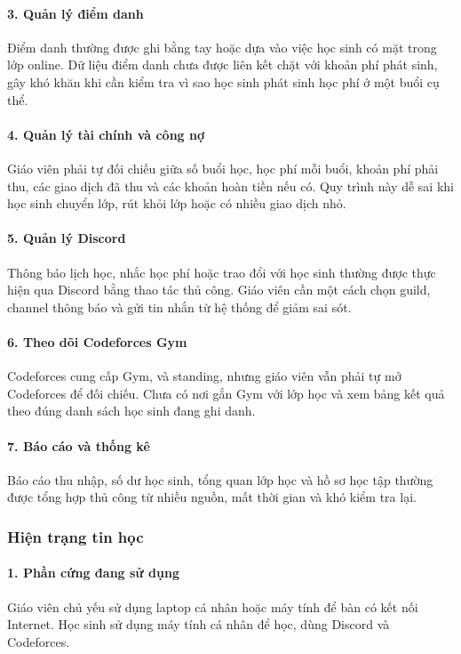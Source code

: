\documentclass[12pt,a4paper]{article}
\newcommand{\code}[1]{{\ttfamily\seqsplit{#1}}}
\begin{document}
\paragraph{3. Quản lý điểm danh}
Điểm danh thường được ghi bằng tay hoặc dựa vào việc học sinh có mặt trong lớp
online. Dữ liệu điểm danh chưa được liên kết chặt với khoản phí phát sinh, gây
khó khăn khi cần kiểm tra vì sao học sinh phát sinh học phí ở một buổi cụ thể.

\paragraph{4. Quản lý tài chính và công nợ}
Giáo viên phải tự đối chiếu giữa số buổi học, học phí mỗi buổi, khoản phí phải
thu, các giao dịch đã thu và các khoản hoàn tiền nếu có. Quy trình này dễ sai
khi học sinh chuyển lớp, rút khỏi lớp hoặc có nhiều giao dịch nhỏ.

\paragraph{5. Quản lý Discord}
Thông báo lịch học, nhắc học phí hoặc trao đổi với học sinh thường được thực
hiện qua Discord bằng thao tác thủ công. Giáo viên cần một cách chọn guild,
channel thông báo và gửi tin nhắn từ hệ thống để giảm sai sót.

\paragraph{6. Theo dõi Codeforces Gym}
Codeforces cung cấp Gym, \code{GymProblem} và standing, nhưng giáo viên vẫn phải tự mở
Codeforces để đối chiếu. Chưa có nơi gắn Gym với lớp học và xem bảng kết quả
theo đúng danh sách học sinh đang ghi danh.

\paragraph{7. Báo cáo và thống kê}
Báo cáo thu nhập, số dư học sinh, tổng quan lớp học và hồ sơ học tập thường
được tổng hợp thủ công từ nhiều nguồn, mất thời gian và khó kiểm tra lại.

\subsubsection{Hiện trạng tin học}

\paragraph{1. Phần cứng đang sử dụng}
Giáo viên chủ yếu sử dụng laptop cá nhân hoặc máy tính để bàn có kết nối
Internet. Học sinh sử dụng máy tính cá nhân để học, dùng Discord và Codeforces.
\end{document}
